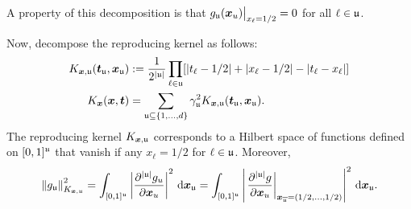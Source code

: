 \documentclass[letterpaper]{amsart}
\newcommand{\KX}{{K_{\vx}}}
\newcommand{\KXu}{K_{\vx,\fu}}
\begin{document}
A property of this decomposition is that  $g_{\mathfrak{u}}(\boldsymbol{x}_u) \bigr \vert_{x_\ell = 1/2} = 0$ for all $\ell \in \mathfrak{u}$.

Now, decompose the reproducing kernel as follows:
\begin{align*}
	K_{\vx,\fu} (\vt_\fu,\vx_\fu) &:= \frac{1}{2^{\abs{\fu}}}\prod_{\ell \in \fu} [\abs{t_\ell -1/2} + \abs{x_\ell-1/2} - \abs{t_\ell  - x_\ell}] \\
	\KX(\vx,\vt) & = \sum_{\fu \subseteq \{1, \ldots, d\}} \gamma_\fu^2   K_{\vx,\fu} (\vt_\fu,\vx_\fu).
\end{align*}
The reproducing kernel $K_{\boldsymbol{x},\mathfrak{u}}$ corresponds to a Hilbert space of functions defined on $[0,1]^{\mathfrak{u}}$ that vanish if any $x_\ell = 1/2$ for $\ell \in \mathfrak{u}$.  Moreover,
\begin{equation*}
	\norm[\KXu]{g_\fu}^2 = \int_{[0,1]^{\fu}} \abs{\frac{\partial^{\abs{\fu}} g_{u}}{\partial \vx_u}}^2 \, \dif \vx_\fu =  \int_{[0,1]^{\fu}} \abs{\left . \frac{\partial^{\abs{\fu}} g}{\partial \vx_u} \right \rvert_{\vx_{\overline{\fu}} = (1/2, \ldots, 1/2)}}^2 \, \dif \vx_\fu.
\end{equation*}
\end{document}
